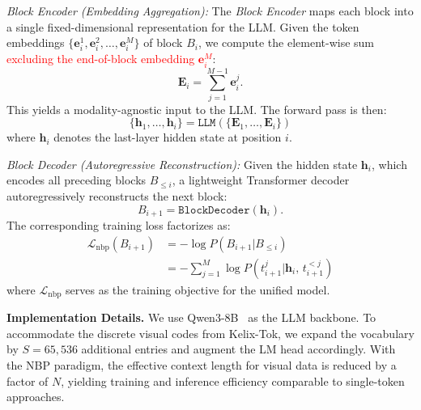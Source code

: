 \documentclass[11pt, a4paper, logo, copyright]{googledeepmind}
\newcommand{\myred}[1]{\textcolor{red}{#1}}
\begin{document}
\textit{Block Encoder (Embedding Aggregation):}
The \textit{Block Encoder} maps each block into a single fixed-dimensional representation for the LLM. Given the token embeddings $\{\mathbf{e}_{i}^1, \mathbf{e}_{i}^2, \dots, \mathbf{e}_{i}^M\}$ of block $B_i$, we compute the element-wise sum \myred{excluding the end-of-block embedding $\mathbf{e}_i^M$}:
\begin{equation}
\label{eq:ea_1}
    \mathbf{E}_i = \sum_{j=1}^{M-1} \mathbf{e}_{i}^j.
\end{equation}
This yields a modality-agnostic input to the LLM. The forward pass is then:
\begin{equation}
\label{eq:ea}
    \{\mathbf{h}_1,\dots,\mathbf{h}_{i}\} = \texttt{LLM}\left(\{\mathbf{E}_1,\dots,\mathbf{E}_{i}\}\right)
\end{equation}
where $\mathbf{h}_i$ denotes the last-layer hidden state at position $i$.

\textit{Block Decoder (Autoregressive Reconstruction):}
Given the hidden state $\mathbf{h}_i$, which encodes all preceding blocks $B_{\leq i}$, a lightweight Transformer decoder autoregressively reconstructs the next block:
\begin{equation}
    B_{i+1} = \texttt{BlockDecoder}\left(\mathbf{h}_i\right).
    \label{blockdecoder}
\end{equation}
The corresponding training loss factorizes as:
%
\begin{align*}
\mathcal{L}_{\text{nbp}}(B_{i+1}) &= -\log P\left(B_{i+1}\big|B_{\leq i}\right) \\
                  &= - \sum_{j=1}^{M} \log P\left(t^{j}_{i+1}\big|\mathbf{h}_{i},\, t^{<j}_{i+1}\right)
\end{align*}
%
where $\mathcal{L}_{\text{nbp}}$ serves as the training objective for the unified model.

\textbf{Implementation Details.}
We use Qwen3-8B~\citep{yang2025qwen3} as the LLM backbone. To accommodate the discrete visual codes from Kelix-Tok, we expand the vocabulary by $S = 65{,}536$ additional entries and augment the LM head accordingly. With the NBP paradigm, the effective context length for visual data is reduced by a factor of $N$, yielding training and inference efficiency comparable to single-token approaches. 

\end{document}
